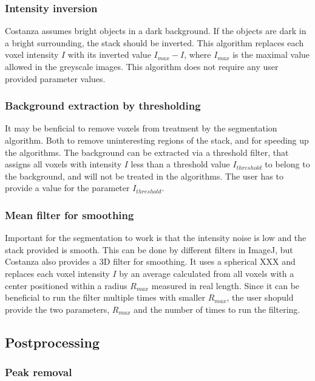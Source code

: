 \documentclass[a4paper,12pt]{article}
\begin{document}
\subsubsection{Intensity inversion}

Costanza assumes bright objects in a dark background. If the objects
are dark in a bright surrounding, the stack should be inverted. This
algorithm replaces each voxel intensity $I$ with its inverted value
$I_{max}-I$, where $I_{max}$ is the maximal value allowed in the
greyscale images. This algorithm does not require any user provided
parameter values.

\subsubsection{Background extraction by thresholding}

It may be benficial to remove voxels from treatment by the
segmentation algorithm. Both to remove uninteresting regions of the
stack, and for speeding up the algorithms. The background can be
extracted via a threshold filter, that assigns all voxels with
intensity $I$ less than a threshold value $I_{threshold}$ to belong to
the background, and will not be treated in the algorithms. The user
has to provide a value for the parameter $I_{threshold}$.

\subsubsection{Mean filter for smoothing}

Important for the segmentation to work is that the intensity noise is
low and the stack provided is smooth. This can be done by different
filters in ImageJ, but Costanza also provides a 3D filter for
smoothing. It uses a spherical XXX and replaces each voxel intensity
$I$ by an average calculated from all voxels with a center positioned
within a radius $R_{max}$ measured in real length. Since it can be
beneficial to run the filter multiple times with smaller $R_{max}$,
the user shopuld provide the two parameters, $R_{max}$ and the number
of times to run the filtering.

\subsection{Postprocessing}

\subsubsection{Peak removal}
\end{document}
